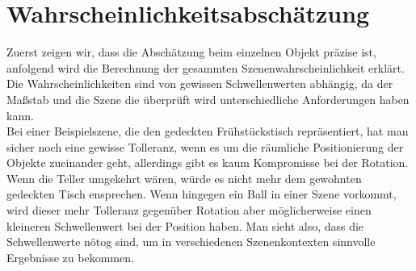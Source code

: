 \section{Wahrscheinlichkeitsabschätzung}
Zuerst zeigen wir, dass die Abschätzung beim einzelnen Objekt präzise ist, anfolgend wird die Berechnung der gesammten Szenenwahrscheinlichkeit erklärt. Die Wahrscheinlichkeiten sind von gewissen Schwellenwerten abhängig, da der Maßstab und die Szene die überprüft wird unterschiedliche Anforderungen haben kann. \smallskip\\
Bei einer Beispielszene, die den gedeckten Frühstückstisch repräsentiert, hat man sicher noch eine gewisse Tolleranz, wenn es um die räumliche Positionierung der Objekte zueinander geht, allerdings gibt es kaum Kompromisse bei der Rotation. Wenn die Teller umgekehrt wären, würde es nicht mehr dem gewohnten gedeckten Tisch ensprechen. Wenn hingegen ein Ball in einer Szene vorkommt, wird dieser mehr Tolleranz gegenüber Rotation aber möglicherweise einen kleineren Schwellenwert bei der Position haben. Man sieht also, dass die Schwellenwerte nötog sind, um in verschiedenen Szenenkontexten sinnvolle Ergebnisse zu bekommen.\cite{gich14}
